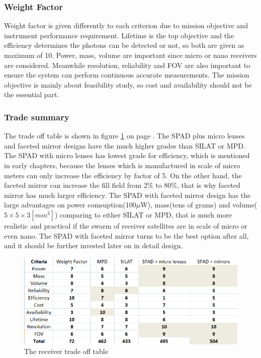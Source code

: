 \subsubsection{Weight Factor}
\label{TOReceiverWF}
Weight factor is given differently to each criterion due to mission objective and instrument performance requirement. Lifetime is the top objective and the efficiency determines the photons can be detected or not, so both are given as maximum of 10. Power, mass, volume are important since micro or nano receivers are considered. Meanwhile resolution, reliability and \acs{FOV} are also important to ensure the system can perform continuous accurate measurements. The mission objective is mainly about feasibility study, so cost and availability should not be the essential part.

\subsubsection{Trade summary}
\label{TOReceiverS}
The trade off table is shown in figure \ref{fig:receiver_tradeoff} on page \pageref{fig:receiver_tradeoff}. The \acs{SPAD} plus micro lenses and faceted mirror designs have the much higher grades than \acs{SILAT} or \acs{MPD}. The \acs{SPAD} with micro lenses has lowest grade for efficiency, which is mentioned in early chapters, because the lenses which is manufactured in scale of micro meters can only increase the efficiency by factor of 5. On the other hand, the faceted mirror can increase the fill field from 2\% to 80\%, that is why faceted mirror has much larger efficiency. The \acs{SPAD} with faceted mirror design has the large advantages on power comsuption(100$\mu$W), mass(tens of grams) and volume($5\times5\times3[mm^{3}]$) comparing to either \acs{SILAT} or \acs{MPD}, that is much more realistic and practical if the swarm of receiver satellites are in scale of micro or even nano. The \acs{SPAD} with faceted mirror turns to be the best option after all, and it should be further invested later on in detail design.

\begin{figure}[ht!]
\centering
\includegraphics[scale = 1]{chapters/img/Receiver_tradeoff.png}
\caption{The receiver trade off table}
\label{fig:receiver_tradeoff}
\end{figure}

